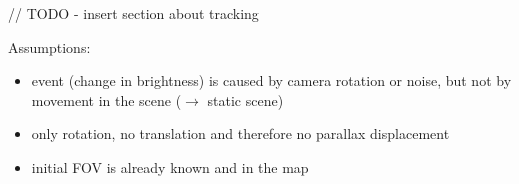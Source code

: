 // TODO - insert section about tracking

Assumptions:
\begin{itemize}
\item event (change in brightness) is caused by camera rotation or noise, but not by movement in the scene ($\rightarrow$ static scene)
\item only rotation, no translation and therefore no parallax displacement
\item initial FOV is already known and in the map
\end{itemize}
